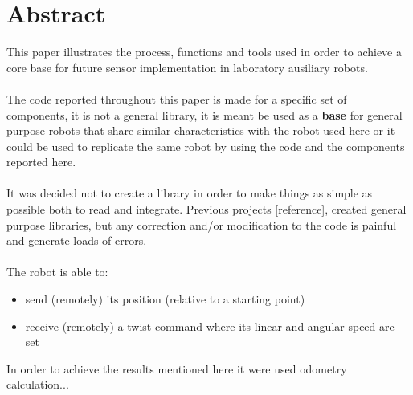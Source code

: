 \chapter*{Abstract}
This paper illustrates the process, functions and tools used in order to achieve a core base for future sensor implementation in laboratory ausiliary robots.
\\ \\
The code reported throughout this paper is made for a specific set of components, it is not a general library, it is meant be used as a \textbf{base} for general purpose robots that share similar characteristics
 with the robot used here or it could be used to replicate the same robot by using the code and the components reported here.
\\ \\
It was decided not to create a library in order to make things as simple as possible both to read and integrate. Previous projects [reference], created general purpose libraries, but any correction and/or modification 
to the code is painful and generate loads of errors.
\\ \\
The robot is able to:
\begin{itemize}
    \item send (remotely) its position (relative to a starting point)
    \item receive (remotely) a twist command where its linear and angular speed are set
\end{itemize}

In order to achieve the results mentioned here it were used odometry calculation...

